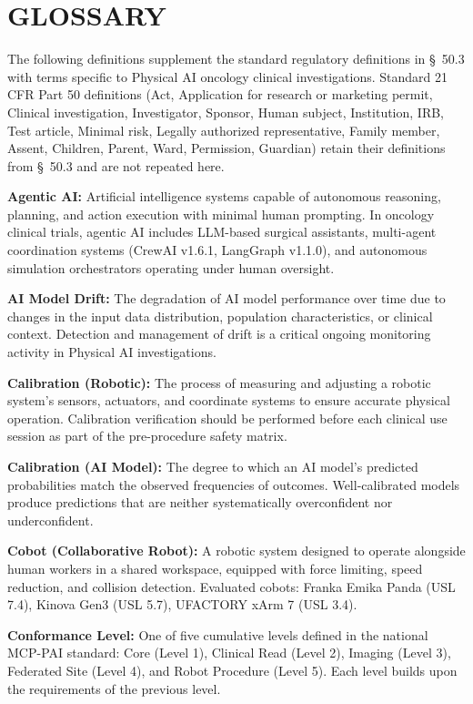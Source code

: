 \clearpage
\section{GLOSSARY}

The following definitions supplement the standard regulatory definitions in \S~50.3 with terms specific to Physical AI oncology clinical investigations. Standard 21 CFR Part 50 definitions (Act, Application for research or marketing permit, Clinical investigation, Investigator, Sponsor, Human subject, Institution, IRB, Test article, Minimal risk, Legally authorized representative, Family member, Assent, Children, Parent, Ward, Permission, Guardian) retain their definitions from \S~50.3 and are not repeated here.

\textbf{Agentic AI:} Artificial intelligence systems capable of autonomous reasoning, planning, and action execution with minimal human prompting. In oncology clinical trials, agentic AI includes LLM-based surgical assistants, multi-agent coordination systems (CrewAI v1.6.1, LangGraph v1.1.0), and autonomous simulation orchestrators operating under human oversight.

\textbf{AI Model Drift:} The degradation of AI model performance over time due to changes in the input data distribution, population characteristics, or clinical context. Detection and management of drift is a critical ongoing monitoring activity in Physical AI investigations.

\textbf{Calibration (Robotic):} The process of measuring and adjusting a robotic system's sensors, actuators, and coordinate systems to ensure accurate physical operation. Calibration verification should be performed before each clinical use session as part of the pre-procedure safety matrix.

\textbf{Calibration (AI Model):} The degree to which an AI model's predicted probabilities match the observed frequencies of outcomes. Well-calibrated models produce predictions that are neither systematically overconfident nor underconfident.

\textbf{Cobot (Collaborative Robot):} A robotic system designed to operate alongside human workers in a shared workspace, equipped with force limiting, speed reduction, and collision detection. Evaluated cobots: Franka Emika Panda (USL 7.4), Kinova Gen3 (USL 5.7), UFACTORY xArm 7 (USL 3.4).

\textbf{Conformance Level:} One of five cumulative levels defined in the national MCP-PAI standard: Core (Level 1), Clinical Read (Level 2), Imaging (Level 3), Federated Site (Level 4), and Robot Procedure (Level 5). Each level builds upon the requirements of the previous level.

